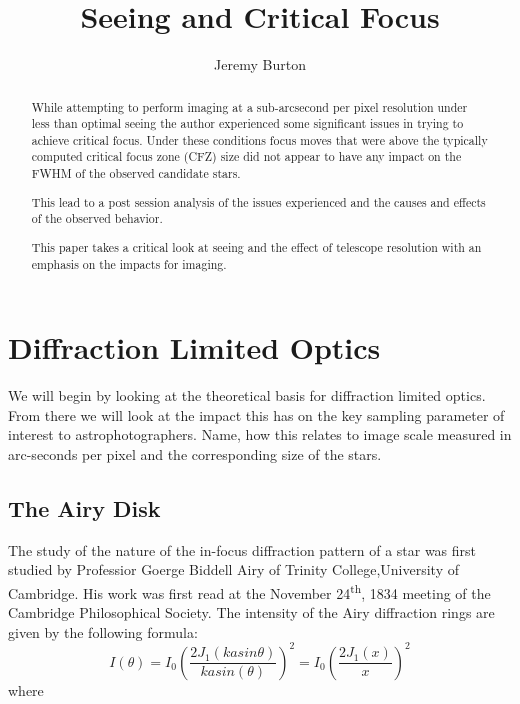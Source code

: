 \documentclass[11pt]{article}
\begin{document}
\title{Seeing and Critical Focus}
\author{Jeremy Burton}


\maketitle

\begin{abstract}
\setlength{\parindent}{0em}
\setlength{\parskip}{1em}

While attempting to perform imaging at a sub-arcsecond per pixel resolution under less than optimal seeing the author experienced some significant issues in trying to achieve critical focus.  Under these conditions focus moves that were above the typically computed critical focus zone (CFZ) size did not appear to have any impact on the FWHM of the observed candidate stars.

This lead to a post session analysis of the issues experienced and the causes and effects of the observed behavior.  

This paper takes a critical look at seeing and the effect of telescope resolution with an emphasis on the impacts for imaging.

\end{abstract}
\newpage

\tableofcontents
\newpage

\section{Diffraction Limited Optics}

We will begin by looking at the theoretical basis for diffraction limited optics.  From there we will look at the impact this has on the key sampling parameter of interest to astrophotographers.  Name, how this relates to image scale measured in arc-seconds per pixel and the corresponding size of the stars.

\subsection{The Airy Disk}

The study of the nature of the in-focus diffraction pattern of a star was first studied by Professior Goerge Biddell Airy of Trinity College,University of Cambridge.   His work was first read at the November 24\textsuperscript{th}, 1834 meeting of the Cambridge Philosophical Society.
The intensity of the Airy diffraction rings are given by the following formula:
\Large
\begin{equation}
\label{eqn:bessel-1}
I(\theta) = I_{0}\left(\frac{2J_{1}(kasin\theta)}{kasin(\theta)}\right)^{2} = I_{0}\left(\frac{2J_{1}(x)}{x}\right)^{2}
\end{equation}
\large
where 
\end{document}
